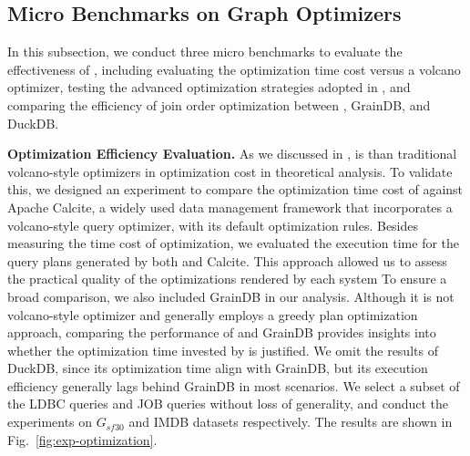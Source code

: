 \subsection{Micro Benchmarks on Graph Optimizers}
\label{sec:experiment-opt}
In this subsection, we conduct three micro benchmarks to evaluate the effectiveness of \name, 
including evaluating the optimization time cost versus a volcano optimizer, testing the advanced optimization strategies adopted in \name, and comparing the efficiency of join order optimization between \name, GrainDB, and DuckDB.

\noindent\textbf{Optimization Efficiency Evaluation.}
As we discussed in , \name is  than traditional volcano-style optimizers in optimization cost in theoretical analysis.
To validate this, we designed an experiment to compare the optimization time cost of \name against Apache Calcite, a widely used data management framework that incorporates a volcano-style query optimizer, with its default optimization rules.
Besides measuring the time cost of optimization, we evaluated the execution time for the query plans generated by both \name and Calcite. This approach allowed us to assess the practical quality of the optimizations rendered by each system
To ensure a broad comparison, we also included GrainDB in our analysis. Although it is not volcano-style optimizer and generally employs a greedy plan optimization approach,
comparing the performance of \name and GrainDB provides insights into whether the optimization time invested by \name is justified.
We omit the results of DuckDB, since its optimization time align with GrainDB, but its execution efficiency generally lags behind GrainDB in most scenarios.
We select a subset of the LDBC queries and JOB queries without loss of generality, and conduct the experiments on $G_{sf30}$ and IMDB datasets respectively.
The results are shown in Fig.~\ref{fig:exp-optimization}.

